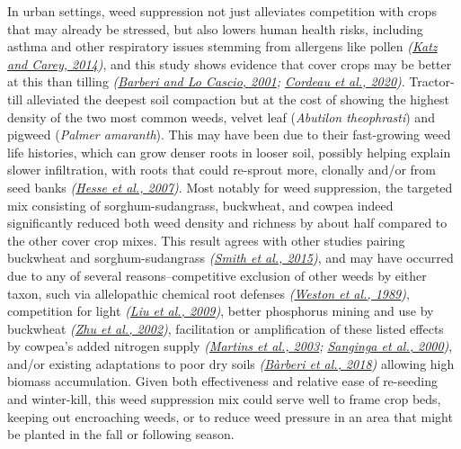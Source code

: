 \documentclass[
  12pt,
]{article}
\begin{document}
In urban settings, weed suppression not just alleviates competition with crops that may already be stressed, but also lowers human health risks, including asthma and other respiratory issues stemming from allergens like pollen \emph{(\protect\hyperlink{ref-katz14}{Katz and Carey, 2014})}, and this study shows evidence that cover crops may be better at this than tilling \emph{(\protect\hyperlink{ref-barberi01}{Barberi and Lo Cascio, 2001}; \protect\hyperlink{ref-cordeau20}{Cordeau et al., 2020})}.
Tractor-till alleviated the deepest soil compaction but at the cost of showing the highest density of the two most common weeds, velvet leaf (\emph{Abutilon theophrasti}) and pigweed (\emph{Palmer amaranth}).
This may have been due to their fast-growing weed life histories, which can grow denser roots in looser soil, possibly helping explain slower infiltration, with roots that could re-sprout more, clonally and/or from seed banks \emph{(\protect\hyperlink{ref-hesse07}{Hesse et al., 2007})}.
Most notably for weed suppression, the targeted mix consisting of sorghum-sudangrass, buckwheat, and cowpea indeed significantly reduced both weed density and richness by about half compared to the other cover crop mixes.
This result agrees with other studies pairing buckwheat and sorghum-sudangrass \emph{(\protect\hyperlink{ref-smith15}{Smith et al., 2015})}, and may have occurred due to any of several reasons--competitive exclusion of other weeds by either taxon, such via allelopathic chemical root defenses \emph{(\protect\hyperlink{ref-weston89}{Weston et al., 1989})}, competition for light \emph{(\protect\hyperlink{ref-liu09b}{Liu et al., 2009})}, better phosphorus mining and use by buckwheat \emph{(\protect\hyperlink{ref-zhu02}{Zhu et al., 2002})}, facilitation or amplification of these listed effects by cowpea's added nitrogen supply \emph{(\protect\hyperlink{ref-martins03}{Martins et al., 2003}; \protect\hyperlink{ref-sanginga00}{Sanginga et al., 2000})}, and/or existing adaptations to poor dry soils \emph{(\protect\hyperlink{ref-barberi18}{Bàrberi et al., 2018})} allowing high biomass accumulation.
Given both effectiveness and relative ease of re-seeding and winter-kill, this weed suppression mix could serve well to frame crop beds, keeping out encroaching weeds, or to reduce weed pressure in an area that might be planted in the fall or following season.
\end{document}
